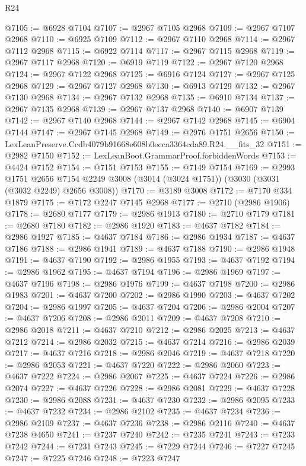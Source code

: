 \begin{lexlean}{R24}
\begin{coremodule}
@7105 := @6928 @7104
@7107 := @2967 @7105 @2968
@7109 := @2967 @7107 @2968
@7110 := @6925 @7109
@7112 := @2967 @7110 @2968
@7114 := @2967 @7112 @2968
@7115 := @6922 @7114
@7117 := @2967 @7115 @2968
@7119 := @2967 @7117 @2968
@7120 := @6919 @7119
@7122 := @2967 @7120 @2968
@7124 := @2967 @7122 @2968
@7125 := @6916 @7124
@7127 := @2967 @7125 @2968
@7129 := @2967 @7127 @2968
@7130 := @6913 @7129
@7132 := @2967 @7130 @2968
@7134 := @2967 @7132 @2968
@7135 := @6910 @7134
@7137 := @2967 @7135 @2968
@7139 := @2967 @7137 @2968
@7140 := @6907 @7139
@7142 := @2967 @7140 @2968
@7144 := @2967 @7142 @2968
@7145 := @6904 @7144
@7147 := @2967 @7145 @2968
@7149 := @2976 @1751 @2656
@7150 := LexLeanPreserve.Ccdb4079b91668e608b0ecca3364cda89.R24.__fits_32
@7151 := @2982 @7150
@7152 := LexLeanBoot.GrammarProof.forbiddenWords
@7153 := @4424 @7152
@7154 := @7151 @7153
@7155 := @7149 @7154
@7169 := @2993
    @1751
    @2656
    @7154
    @2249
    @3008
    (@3014 (@3024 @1751))
    (@3030 (@3031 (@3032 @2249) @2656 @3008))
@7170 := @3189 @3008
@7172 := @7170 @334 @1879
@7175 := @7172 @2247 @7145 @2968
@7177 := @2710 (@2986 @1906)
@7178 := @2680 @7177
@7179 := @2986 @1913
@7180 := @2710 @7179
@7181 := @2680 @7180
@7182 := @2986 @1920
@7183 := @4637 @7182
@7184 := @2986 @1927
@7185 := @4637 @7184
@7186 := @2986 @1934
@7187 := @4637 @7186
@7188 := @2986 @1941
@7189 := @4637 @7188
@7190 := @2986 @1948
@7191 := @4637 @7190
@7192 := @2986 @1955
@7193 := @4637 @7192
@7194 := @2986 @1962
@7195 := @4637 @7194
@7196 := @2986 @1969
@7197 := @4637 @7196
@7198 := @2986 @1976
@7199 := @4637 @7198
@7200 := @2986 @1983
@7201 := @4637 @7200
@7202 := @2986 @1990
@7203 := @4637 @7202
@7204 := @2986 @1997
@7205 := @4637 @7204
@7206 := @2986 @2004
@7207 := @4637 @7206
@7208 := @2986 @2011
@7209 := @4637 @7208
@7210 := @2986 @2018
@7211 := @4637 @7210
@7212 := @2986 @2025
@7213 := @4637 @7212
@7214 := @2986 @2032
@7215 := @4637 @7214
@7216 := @2986 @2039
@7217 := @4637 @7216
@7218 := @2986 @2046
@7219 := @4637 @7218
@7220 := @2986 @2053
@7221 := @4637 @7220
@7222 := @2986 @2060
@7223 := @4637 @7222
@7224 := @2986 @2067
@7225 := @4637 @7224
@7226 := @2986 @2074
@7227 := @4637 @7226
@7228 := @2986 @2081
@7229 := @4637 @7228
@7230 := @2986 @2088
@7231 := @4637 @7230
@7232 := @2986 @2095
@7233 := @4637 @7232
@7234 := @2986 @2102
@7235 := @4637 @7234
@7236 := @2986 @2109
@7237 := @4637 @7236
@7238 := @2986 @2116
@7240 := @4637 @7238 @4650
@7241 := @7237 @7240
@7242 := @7235 @7241
@7243 := @7233 @7242
@7244 := @7231 @7243
@7245 := @7229 @7244
@7246 := @7227 @7245
@7247 := @7225 @7246
@7248 := @7223 @7247

\end{coremodule}
\end{lexlean}
